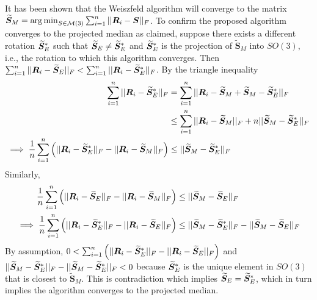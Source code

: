 It has been shown that the Weiszfeld algorithm will converge to the matrix $\widetilde{\bm S}_M=\operatorname*{arg\,min}_{S\in\mathcal{M}(3)}\sum_{i=1}^n||\bm R_i-\bm S||_F$.  To confirm the proposed algorithm converges to the projected median as claimed, suppose there exists a different rotation  ${\widetilde{\bm S}_E}^*$ such that ${\widetilde{\bm S}_E}\neq{\widetilde{\bm S}_E}^*$ and ${\widetilde{\bm S}_E}^*$ is the projection of  $\widetilde{\bm S}_M$ into $SO(3)$, i.e., the rotation to which this algorithm converges.  Then $\sum_{i=1}^n||\bm R_i-{\widetilde{\bm S}_E}||_F<\sum_{i=1}^n||\bm R_i-{\widetilde{\bm S}_E}^*||_F$.  By the triangle inequality
\begin{align*}
\sum_{i=1}^n||\bm R_i-{\widetilde{\bm S}_E}^*||_F
&=\sum_{i=1}^n||\bm R_i-\widetilde{\bm S}_M+\widetilde{\bm S}_M-{\widetilde{\bm S}_E}^*||_F\\
&\leq\sum_{i=1}^n||\bm R_i-\widetilde{\bm S}_M||_F+n||\widetilde{\bm S}_M-{\widetilde{\bm S}_E}^*||_F\\
\implies \frac{1}{n}\sum_{i=1}^n\left(||\bm R_i-{\widetilde{\bm S}_E}^*||_F-||\bm R_i-\widetilde{\bm S}_M||_F\right)&\leq||\widetilde{\bm S}_M-{\widetilde{\bm S}_E}^*||_F
\end{align*}
Similarly,
\begin{align}\label{eq:contra}
\frac{1}{n}\sum_{i=1}^n\left(||\bm R_i-{\widetilde{\bm S}_E}||_F-||\bm R_i-\widetilde{\bm S}_M||_F\right)&\leq||\widetilde{\bm S}_M-{\widetilde{\bm S}_E}||_F\nonumber\\
\implies \frac{1}{n}\sum_{i=1}^n\left(||\bm R_i-{\widetilde{\bm S}_E}^*||_F-||\bm R_i-{\widetilde{\bm S}_E}||_F\right)&\leq||\widetilde{\bm S}_M-{\widetilde{\bm S}_E}^*||_F-||\widetilde{\bm S}_M-{\widetilde{\bm S}_E}||_F
\end{align}
By assumption, $0<\sum_{i=1}^n\left(||\bm R_i-{\widetilde{\bm S}_E}^*||_F-||\bm R_i-{\widetilde{\bm S}_E}||_F\right)$ and $||\widetilde{\bm S}_M-{\widetilde{\bm S}_E}^*||_F-||\widetilde{\bm S}_M-{\widetilde{\bm S}_E}^*||_F<0$ because ${\widetilde{\bm S}_E}^*$ is the unique element in $SO(3)$ that is closest to $\widetilde{\bm S}_M$.  This is contradiction which implies ${\widetilde{\bm S}_E}={\widetilde{\bm S}_E}^*$, which in turn implies the algorithm converges to the projected median.

